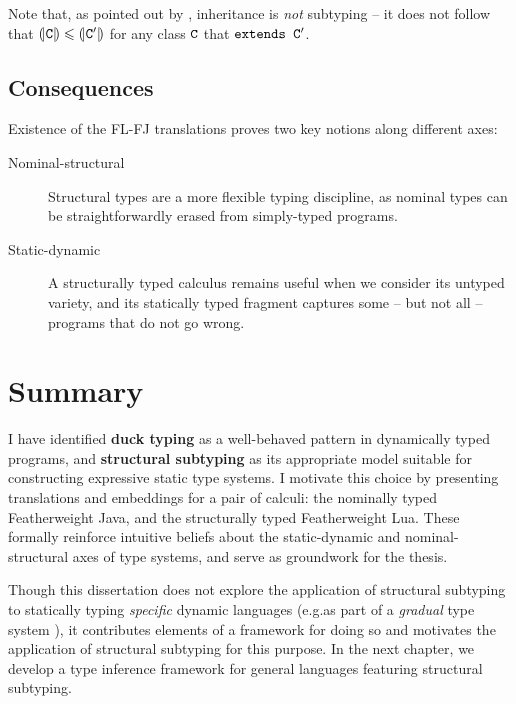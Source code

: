 Note that, as pointed out by \textcite{inheritance-subtyping}, inheritance is \emph{not} subtyping -- it does not follow that $\denoty{\fj C} \sub \denoty {\fj C'}$ for any class $\texttt{C}$ that $\texttt{extends C}'$.

\subsection{Consequences}

Existence of the FL-FJ translations proves two key notions along different axes: \begin{description}
    \item[Nominal-structural] Structural types are a more flexible typing discipline, as nominal types can be straightforwardly erased from simply-typed programs.
    \item[Static-dynamic] A structurally typed calculus remains useful when we consider its untyped variety, and its statically typed fragment captures some -- but not all -- programs that do not go wrong.
\end{description}

\section{Summary}

I have identified \textbf{duck typing} as a well-behaved pattern in dynamically typed programs, and \textbf{structural subtyping} as its appropriate model suitable for constructing expressive static type systems. I motivate this choice by presenting translations and embeddings for a pair of calculi: the nominally typed Featherweight Java, and the structurally typed Featherweight Lua. These formally reinforce intuitive beliefs about the static-dynamic and nominal-structural axes of type systems, and serve as groundwork for the thesis.

Though this dissertation does not explore the application of structural subtyping to statically typing \emph{specific} dynamic languages (e.g.\@ as part of a \emph{gradual} type system \cite{gradual-typing-for-objects}), it contributes elements of a framework for doing so and motivates the application of structural subtyping for this purpose. In the next chapter, we develop a type inference framework for general languages featuring structural subtyping.


